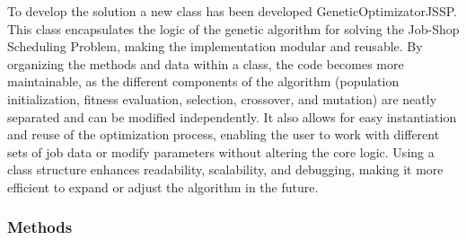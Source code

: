 \documentclass[11pt, a4paper]{article}
\begin{document}
To develop the solution a new class has been developed GeneticOptimizatorJSSP. This class encapsulates the logic of the genetic algorithm for solving the Job-Shop 
Scheduling Problem, making the implementation modular and reusable. By organizing the methods and data within a class, the code becomes more maintainable, as the 
different components of the algorithm (population initialization, fitness evaluation, selection, crossover, and mutation) are neatly separated and can be modified 
independently. It also allows for easy instantiation and reuse of the optimization process, enabling the user to work with different sets of job data or modify 
parameters without altering the core logic. Using a class structure enhances readability, scalability, and debugging, making it more efficient to expand or adjust the 
algorithm in the future.

\subsubsection{Methods}
\end{document}
